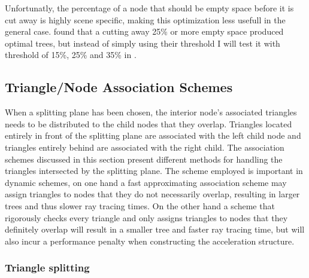 Unfortunatly, the percentage of a node that should be empty space before it is
cut away is highly scene specific, making this optimization less usefull in the
general case. \zhou found that a cutting away 25\% or more empty space produced
optimal trees, but instead of simply using their threshold I will test it with
threshold of 15\%, 25\% and 35\% in .




\subsection{Triangle/Node Association Schemes}\label{sec:splittingSchemes}

When a splitting plane has been chosen, the interior node's associated triangles
needs to be distributed to the child nodes that they overlap. Triangles located
entirely in front of the splitting plane are associated with the left child node
and triangles entirely behind are associated with the right child. The
association schemes discussed in this section present different methods for
handling the triangles intersected by the splitting plane. The scheme employed
is important in dynamic schemes, on one hand a fast approximating association
scheme may assign triangles to nodes that they do not necessarily overlap,
resulting in larger trees and thus slower ray tracing times. On the other hand a
scheme that rigorously checks every triangle and only assigns triangles to nodes
that they definitely overlap will result in a smaller tree and faster ray
tracing time, but will also incur a performance penalty when constructing the
acceleration structure.





\subsubsection{Triangle splitting}

